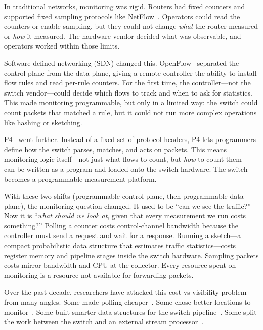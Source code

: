 \documentclass[letterpaper,twocolumn,10pt]{article}
\begin{document}
In traditional networks, monitoring was rigid. Routers had
fixed counters and supported fixed sampling protocols like
NetFlow~\cite{claise2004netflow}. Operators could read the
counters or enable sampling, but they could not change
\emph{what} the router measured or \emph{how} it measured.
The hardware vendor decided what was observable, and operators
worked within those limits.

Software-defined networking (SDN) changed this.
OpenFlow~\cite{mckeown2008openflow} separated the control plane
from the data plane, giving a remote controller the ability to
install flow rules and read per-rule counters. For the first time,
the controller---not the switch vendor---could decide which flows
to track and when to ask for statistics. This made monitoring
programmable, but only in a limited way: the switch could count
packets that matched a rule, but it could not run more complex
operations like hashing or sketching.

P4~\cite{bosshart2014p4} went further. Instead of a fixed set of
protocol headers, P4 lets programmers define how the switch
parses, matches, and acts on packets. This means monitoring logic
itself---not just what flows to count, but \emph{how} to count
them---can be written as a program and loaded onto the switch
hardware. The switch becomes a programmable measurement platform.

With these two shifts (programmable control plane, then
programmable data plane), the monitoring question changed. It
used to be ``can we see the traffic?'' Now it is ``\emph{what
should we look at}, given that every measurement we run costs
something?'' Polling a counter costs control-channel bandwidth
because the controller must send a request and wait for a
response. Running a sketch---a compact probabilistic data
structure that estimates traffic statistics---costs register
memory and pipeline stages inside the switch hardware. Sampling
packets costs mirror bandwidth and CPU at the collector. Every
resource spent on monitoring is a resource not available for
forwarding packets.

Over the past decade, researchers have attacked this
cost-vs-visibility problem from many angles. Some made polling
cheaper~\cite{adrichem2014opennetmon, chowdhury2014payless,
xu2017wildcard}. Some chose better locations to
monitor~\cite{su2014flowcover, yoon2017sampling}. Some built
smarter data structures for the switch
pipeline~\cite{liu2016univmon, namkung2022sketchlib,
namkung2023sketchovsky, srivastava2024sketchplan}. Some split
the work between the switch and an external stream
processor~\cite{gupta2018sonata}.
\end{document}
